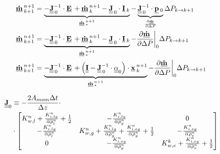  \begin{align}
 \vec{\dot{m}}^{n+1}_{k+1} & =
 \underbrace{-\mat{J}_{\,0}^{-1}\cdot \vec{E} + \vec{\dot{m}}^{n+1}_{k} - \mat{J}_{\,0}\cdot \vec{I}_{k}}_{\vec{\dot{m}}^{n+1}_{*}} - \underbrace{\mat{J}_{\,0}^{-1} \cdot \vec{p}_{0}}_{\frac{\partial \vec{\dot{m}}}{\partial \Delta P}} \Delta P_{k \rightarrow k+1} \\
 \vec{\dot{m}}^{n+1}_{k+1} & =
 \underbrace{-\mat{J}_{\,0}^{-1}\cdot \vec{E} + \vec{\dot{m}}^{n+1}_{k} - \mat{J}_{\,0}\cdot \vec{I}_{k}}_{\vec{\dot{m}}^{n+1}_{*}} - \frac{\partial \vec{\dot{m}}}{\partial \Delta P}\bigg|_{0} \Delta P_{k \rightarrow k+1} \\
 \vec{\dot{m}}^{n+1}_{k+1} & =
 \underbrace{-\mat{J}_{\,0}^{-1}\cdot \vec{E} + \left(\mat{I} - \mat{J}^{-1}_{\,0}\cdot \mat{\alpha}_{0}\right)\cdot\vec{x}^{n+1}_{k}}_{\vec{\dot{m}}^{n+1}_{*}} - \frac{\partial \vec{\dot{m}}}{\partial \Delta P}\bigg|_{0} \Delta P_{k \rightarrow k+1}
\end{align}


 \begin{align}
 \Mat{J}_{0} & \equiv -\frac{2 A_{mom}\Delta t}{\Delta z}\cdot \nonumber \\
 &\cdot \begin{bmatrix} 
 K^{n}_{w,l} + \frac{K^{n}_{i,lg}}{\Ave{\alpha\rho}^{n}_{l}} +\frac{1}{2} &  -\frac{K^{n}_{i,lg}}{\Ave{\alpha\rho}^{n}_{g}} & 0\\
 -\frac{K^{n}_{i,lg}}{\Ave{\alpha\rho}^{n}_{l}} &  K^{n}_{w,g} + \frac{K^{n}_{i,lg}}{\Ave{\alpha\rho}^{n}_{g}}+\frac{K^{n}_{i,eg}}{\Ave{\alpha\rho}^{n}_{g}} +\frac{1}{2} & -\frac{K^{n}_{i,eg}}{\Ave{\alpha\rho}^{n}_{e}}\\
 0 & -\frac{K^{n}_{i,eg}}{\Ave{\alpha\rho}^{n}_{g}} &  K^{k}_{w,e} + \frac{K^{n}_{i,eg}}{\Ave{\alpha\rho}^{n}_{e}}+\frac{1}{2}\\
 \end{bmatrix}
 \end{align}